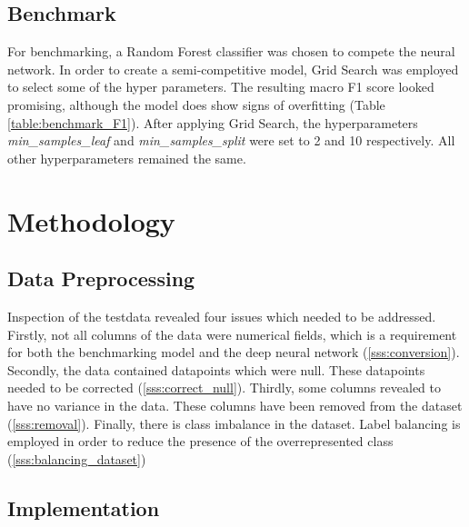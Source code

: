 \documentclass[preprint,12pt]{elsarticle}
\begin{document}
\subsection{Benchmark}
For benchmarking, a Random Forest classifier was chosen to compete the neural network. In order to create a semi-competitive model, Grid Search was employed to select some of the hyper parameters. The resulting macro F1 score looked promising, although the model does show signs of overfitting (Table \ref{table:benchmark_F1}). After applying Grid Search, the hyperparameters \textit{min{\_}samples{\_}leaf} and \textit{min{\_}samples{\_}split} were set to 2 and 10 respectively. All other hyperparameters remained the same.

\begin{table}[]
\caption{macro F1 score for benchmarking model}
\label{table:benchmark_F1}
\end{table}


\section{Methodology}
\label{S:3}

\subsection{Data Preprocessing}

Inspection of the testdata revealed four issues which needed to be addressed. Firstly, not all columns of the data were numerical fields, which is a requirement for both the benchmarking model and the deep neural network (\ref{sss:conversion}). Secondly, the data contained datapoints which were null. These datapoints needed to be corrected (\ref{sss:correct_null}). Thirdly, some columns revealed to have no variance in the data. These columns have been removed from the dataset (\ref{sss:removal}). Finally, there is class imbalance in the dataset. Label balancing is employed in order to reduce the presence of the overrepresented class (\ref{sss:balancing_dataset})

\subsection{Implementation}
\label{ss:implementation}
\end{document}
